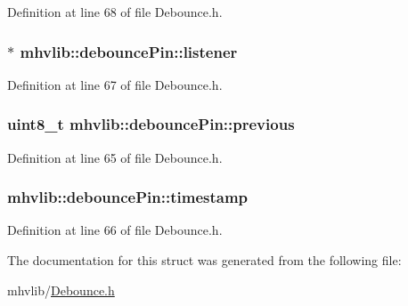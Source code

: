 Definition at line 68 of file Debounce.\-h.

\hypertarget{structmhvlib_1_1debounce_pin_a38dec23701c6f1f81f9cb96b84b19531}{
\subsubsection[{listener}]{$\ast$ mhvlib\-::debounce\-Pin\-::listener}}\label{structmhvlib_1_1debounce_pin_a38dec23701c6f1f81f9cb96b84b19531}


Definition at line 67 of file Debounce.\-h.

\hypertarget{structmhvlib_1_1debounce_pin_a110f46df535f0eeb71c094249d2b7944}{
\subsubsection[{previous}]{\setlength{\rightskip}{0pt plus 5cm}uint8\-\_\-t mhvlib\-::debounce\-Pin\-::previous}}\label{structmhvlib_1_1debounce_pin_a110f46df535f0eeb71c094249d2b7944}


Definition at line 65 of file Debounce.\-h.

\hypertarget{structmhvlib_1_1debounce_pin_a95ae59250967a55e876b699132cccc66}{
\subsubsection[{timestamp}]{ mhvlib\-::debounce\-Pin\-::timestamp}}\label{structmhvlib_1_1debounce_pin_a95ae59250967a55e876b699132cccc66}


Definition at line 66 of file Debounce.\-h.



The documentation for this struct was generated from the following file\-:\begin{DoxyCompactItemize}
\item 
mhvlib/\hyperlink{_debounce_8h}{Debounce.\-h}\end{DoxyCompactItemize}
